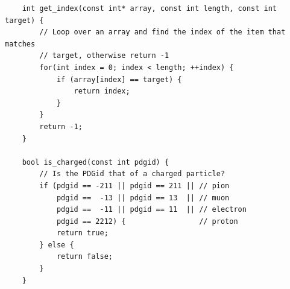 \documentclass[]{article}
\begin{document}
\begin{verbatim}
    int get_index(const int* array, const int length, const int target) {
        // Loop over an array and find the index of the item that matches 
        // target, otherwise return -1
        for(int index = 0; index < length; ++index) {
            if (array[index] == target) {
                return index;
            }
        }
        return -1;
    }

    bool is_charged(const int pdgid) {
        // Is the PDGid that of a charged particle?
        if (pdgid == -211 || pdgid == 211 || // pion
            pdgid ==  -13 || pdgid == 13  || // muon
            pdgid ==  -11 || pdgid == 11  || // electron
            pdgid == 2212) {                 // proton
            return true;
        } else {
            return false;
        }
    }
\end{verbatim}
\end{document}
